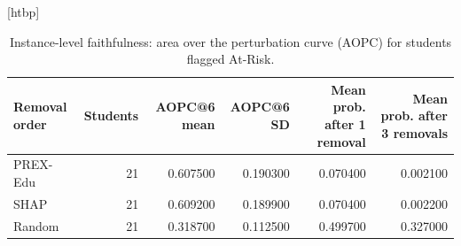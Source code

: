 \begin{table}
\small[htbp]
\caption{Instance-level faithfulness: area over the perturbation curve (AOPC) for students flagged At-Risk.}
\label{tab:S07_instance_aopc}
\begin{tabular}{lrrrrr}
\toprule
Removal order & Students & AOPC@6 mean & AOPC@6 SD & Mean prob. after 1 removal & Mean prob. after 3 removals \\
\midrule
PREX-Edu & 21 & 0.607500 & 0.190300 & 0.070400 & 0.002100 \\
SHAP & 21 & 0.609200 & 0.189900 & 0.070400 & 0.002200 \\
Random & 21 & 0.318700 & 0.112500 & 0.499700 & 0.327000 \\
\bottomrule
\end{tabular}
\end{table}
